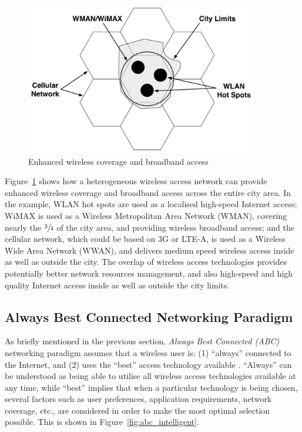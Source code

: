 \begin{figure}[t]
    \centering
    \includegraphics[width=4in]{Intelligent/Figures/wireless_city}
    \caption{Enhanced wireless coverage and broadband access}
    \label{fig:wireless_city_intelligent}
\end{figure}

Figure~\ref{fig:wireless_city_intelligent} shows how a heterogeneous wireless access network can provide enhanced wireless coverage and broadband access across the entire city area. In the example, WLAN hot spots are used as a localised high-speed Internet access; WiMAX is used as a Wireless Metropolitan Area Network (WMAN), covering nearly the $\sfrac{3}{4}$ of the city area, and providing wireless broadband access; and the cellular network, which could be based on 3G or LTE-A, is used as a Wireless Wide Area Network (WWAN), and delivers medium speed wireless access inside as well as outside the city. The overlap of wireless access technologies provides potentially better network resources management, and also high-speed and high quality Internet access inside as well as outside the city limits.

\subsection{Always Best Connected Networking Paradigm} %
\label{sub:always_best_connected_networking_paradigm_intelligent}
As briefly mentioned in the previous section, \emph{Always Best Connected (ABC)} networking paradigm assumes that a wireless user is: (1) ``always'' connected to the Internet, and (2) uses the ``best'' access technology available \cite{ABC03}. ``Always'' can be understood as being able to utilise all wireless access technologies available at any time, while ``best'' implies that when a particular technology is being chosen, several factors such as user preferences, application requirements, network coverage, etc., are considered in order to make the most optimal selection possible. This is shown in Figure~\ref{fig:abc_intelligent}.

